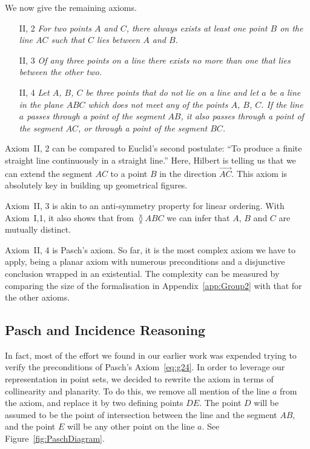 We now give the remaining axioms.
\begin{enumerate}
  \item[II, 2] \emph{For two points $A$ and $C$, there always exists at least one point $B$ on the line $AC$ such that $C$ lies between $A$ and $B$.}
  \item[II, 3] \emph{Of any three points on a line there exists no more than one that lies between the other two.}
  \item[II, 4] \emph{Let $A$, $B$, $C$ be three points that do not lie on a line and let $a$ be a line in the plane $ABC$ which does not meet any of the points $A$, $B$, $C$. If the line $a$ passes through a point of the segment $AB$, it also passes through a point of the segment $AC$, or through a point of the segment $BC$.}
\end{enumerate}

Axiom~II, 2 can be compared to Euclid's second postulate: ``To produce a finite straight line continuously in a straight line.'' Here, Hilbert is telling us that we can extend the segment $AC$ to a point $B$ in the direction $\overrightarrow{AC}$. This axiom is absolutely key in building up geometrical figures.

Axiom~II, 3 is akin to an anti-symmetry property for linear ordering. With Axiom~I,1, it also shows that from $\between{A}{B}{C}$ we can infer that $A$, $B$ and $C$ are mutually distinct. 

Axiom~II, 4 is Pasch's axiom. So far, it is the most complex axiom we have to apply, being a planar axiom with numerous preconditions and a disjunctive conclusion wrapped in an existential. The complexity can be measured by comparing the size of the formalisation in Appendix~\ref{app:Group2} with that for the other axioms.

\subsection{Pasch and Incidence Reasoning}
In fact, most of the effort we found in our earlier work was expended trying to verify the preconditions of Pasch's Axiom~\eqref{eq:g24}. In order to leverage our representation in point sets, we decided to rewrite the axiom in terms of collinearity and planarity. To do this, we remove all mention of the line $a$ from the axiom, and replace it by two defining points $DE$. The point $D$ will be assumed to be the point of intersection between the line and the segment $AB$, and the point $E$ will be any other point on the line $a$. See Figure~\ref{fig:PaschDiagram}.

